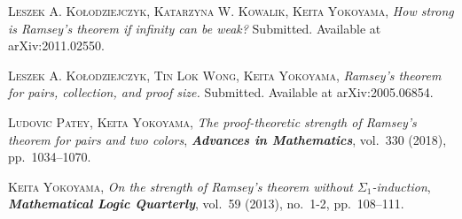 \documentclass[bsl,meeting]{asl}
\begin{document}
\begin{thebibliography}{10}
 


{\scshape Leszek A. Ko\l{}odziejczyk, Katarzyna W. Kowalik, Keita Yokoyama},
{\itshape How strong is Ramsey's theorem if infinity can be weak?} Submitted. Available at arXiv:2011.02550.


{\scshape Leszek A. Ko\l{}odziejczyk, Tin Lok Wong, Keita Yokoyama},
{\itshape Ramsey's theorem for pairs, collection, and proof size.} Submitted.
Available at arXiv:2005.06854.

{\scshape Ludovic Patey, Keita Yokoyama},
{\itshape The proof-theoretic strength of Ramsey's theorem
for pairs and two colors},
{\bfseries\itshape Advances in Mathematics},
vol.~330 (2018), pp.~1034--1070.


{\scshape Keita Yokoyama},
{\itshape On the strength of Ramsey's theorem without {$\Sigma_1$}-induction},
{\bfseries\itshape Mathematical Logic Quarterly},
vol.~59 (2013), no.~1-2, pp.~108--111.



\end{thebibliography}


\vspace*{-0.5\baselineskip}
\end{document}
